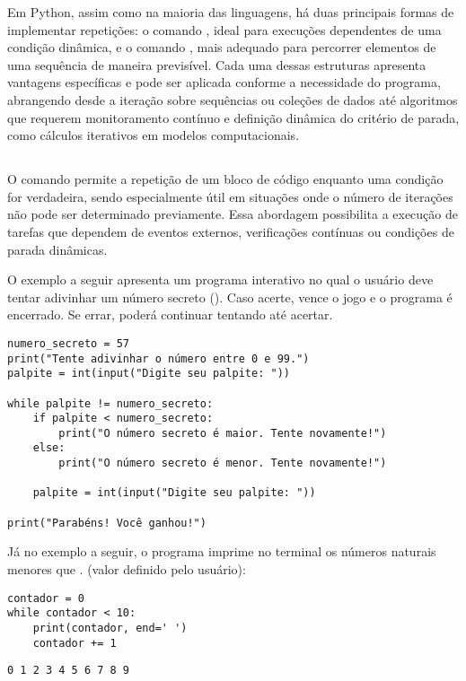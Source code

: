 Em Python, assim como na maioria das linguagens, há duas principais formas de implementar repetições:
o comando , ideal para execuções dependentes de uma condição dinâmica, e o comando ,
mais adequado para percorrer elementos de uma sequência de maneira previsível.
Cada uma dessas estruturas apresenta vantagens específicas e pode ser aplicada conforme a necessidade do programa,
abrangendo desde a iteração sobre sequências ou coleções de dados até algoritmos que requerem monitoramento
contínuo e definição dinâmica do critério de parada, como cálculos iterativos em modelos computacionais.

\subsection{}

O comando  permite a repetição de um bloco de código enquanto uma condição for verdadeira,
sendo especialmente útil em situações onde o número de iterações não pode ser determinado previamente.
Essa abordagem possibilita a execução de tarefas que dependem de eventos externos,
verificações contínuas ou condições de parada dinâmicas.

O exemplo a seguir apresenta um programa interativo no qual o usuário deve tentar adivinhar um número secreto ().
Caso acerte, vence o jogo e o programa é encerrado.
Se errar, poderá continuar tentando até acertar.
\begin{verbatim}
numero_secreto = 57
print("Tente adivinhar o número entre 0 e 99.")
palpite = int(input("Digite seu palpite: "))

while palpite != numero_secreto:
    if palpite < numero_secreto:
        print("O número secreto é maior. Tente novamente!")
    else:
        print("O número secreto é menor. Tente novamente!")

    palpite = int(input("Digite seu palpite: "))

print("Parabéns! Você ganhou!")
\end{verbatim}

Já no exemplo a seguir, o programa imprime no terminal os números naturais menores que .
(valor definido pelo usuário):
\begin{verbatim}
contador = 0
while contador < 10:
    print(contador, end=' ')
    contador += 1
\end{verbatim}
\begin{verbatim}
0 1 2 3 4 5 6 7 8 9
\end{verbatim}

